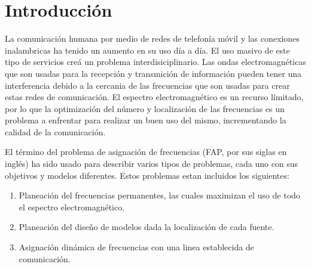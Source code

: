 \section{Introducción}

La comunicación humana por medio de redes de telefonía móvil y las conexiones inalambricas ha tenido un aumento en su uso día a día.\cite{Inzaurralde_2014} El uso masivo de este tipo de servicios creá un problema interdisiciplinario. Las ondas electromagnéticas que son usadas para la recepción y transmición de información pueden tener una interferencia debido a la cercania de las frecuencias que son usadas para crear estas redes de comunicación. El espectro electromagnético es un recurso límitado, por lo que la optimización del número y localización de las frecuencias es un problema a enfrentar para realizar un buen uso del mismo, incrementando la calidad de la comunicación.

El término del problema de asignación de frecuencias (FAP, por sus siglas en inglés) ha sido usado para describir varios tipos de problemas, cada uno con sus objetivos y modelos diferentes. Estos problemas estan incluidos los siguientes:

\begin{enumerate}
    \item Planeación del frecuencias permanentes, las cuales maximizan el uso de todo el espectro electromagnético.\cite{Zoellner_1973}
    \item Planeación del diseño de modelos dada la localización de cada fuente.
    \item Asignación dinámica de frecuencias con una linea establecida de comunicación.
\end{enumerate}